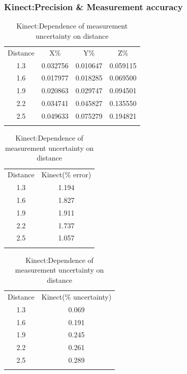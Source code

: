 \documentclass[9pt]{beamer}
\begin{document}

\begin{frame}
\frametitle{Kinect:Precision \& Measurement accuracy}
\begin{table}
\parbox{.45\linewidth}{
\caption{Kinect:Precision along X,Y,Z axes}
\begin{tabular}{c c c c}
\hline\noalign{\smallskip}
Distance & X\% & Y\% & Z\% \\
\noalign{\smallskip}\hline\noalign{\smallskip}
1.3 & 0.032756 & 0.010647 & 0.059115 \\
1.6 & 0.017977 &0.018285 & 0.069500\\
1.9 & 0.020863 & 0.029747 &0.094501 \\
2.2 & 0.034741 & 0.045827 & 0.135550\\
2.5 & 0.049633 & 0.075279 & 0.194821 \\
\noalign{\smallskip}\hline
\end{tabular}
}
\hspace{2cm}\parbox{.45\linewidth}{
\caption{Kinect:Dependence of measurement accuracy on distance}
\begin{tabular}{c c}
\hline\noalign{\smallskip}
Distance  & Kinect(\%  error) \\
\noalign{\smallskip}\hline\noalign{\smallskip}
1.3   & 1.194  \\
1.6   & 1.827  \\
1.9   & 1.911  \\
2.2   & 1.737  \\
2.5   & 1.057  \\
\noalign{\smallskip}\hline
\end{tabular}
}
\parbox{.45\linewidth}{
\caption{Kinect:Dependence of measurement uncertainty on distance}
\begin{tabular}{c c}
\hline\noalign{\smallskip}
Distance   & Kinect(\% uncertainty) \\
\noalign{\smallskip}\hline\noalign{\smallskip}
1.3    & 0.069 \\
1.6    & 0.191 \\
1.9    & 0.245 \\
2.2    & 0.261 \\
2.5    & 0.289 \\
\noalign{\smallskip}\hline
\end{tabular}
}
\end{table}

\end{frame}
\end{document}
